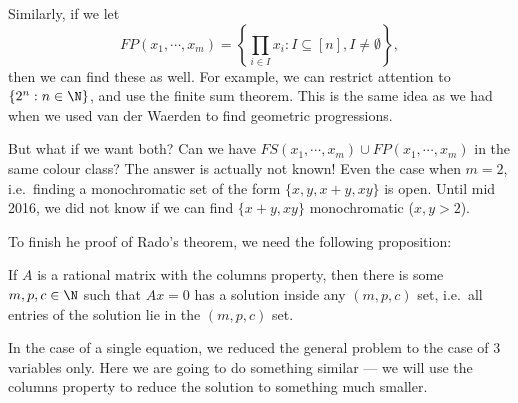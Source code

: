 \documentclass[a4paper]{article}
\begin{document}
Similarly, if we let
\[
  FP(x_1, \cdots, x_m) = \left\{\prod_{i \in I} x_i : I \subseteq [n], I \not= \emptyset\right\},
\]
then we can find these as well. For example, we can restrict attention to $\{2^n: n \in \N\}$, and use the finite sum theorem. This is the same idea as we had when we used van der Waerden to find geometric progressions.

But what if we want both? Can we have $FS(x_1,\cdots, x_m) \cup FP(x_1, \cdots, x_m)$ in the same colour class? The answer is actually not known! Even the case when $m = 2$, i.e.\ finding a monochromatic set of the form $\{x, y, x + y, xy\}$ is open. Until mid 2016, we did not know if we can find $\{x + y, xy\}$ monochromatic ($x, y > 2$).

To finish he proof of Rado's theorem, we need the following proposition:
\begin{prop}
  If $A$ is a rational matrix with the columns property, then there is some $m, p, c \in \N$ such that $Ax = 0$ has a solution inside any $(m, p, c)$ set, i.e.\ all entries of the solution lie in the $(m, p, c)$ set.
\end{prop}
In the case of a single equation, we reduced the general problem to the case of 3 variables only. Here we are going to do something similar --- we will use the columns property to reduce the solution to something much smaller.
\end{document}
